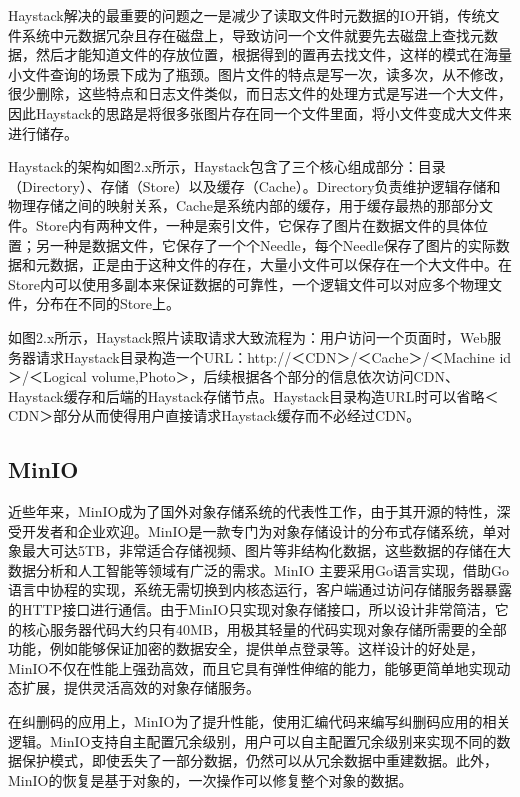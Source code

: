 Haystack解决的最重要的问题之一是减少了读取文件时元数据的IO开销，传统文件系统中元数据冗杂且存在磁盘上，导致访问一个文件就要先去磁盘上查找元数据，然后才能知道文件的存放位置，根据得到的置再去找文件，这样的模式在海量小文件查询的场景下成为了瓶颈。图片文件的特点是写一次，读多次，从不修改，很少删除，这些特点和日志文件类似，而日志文件的处理方式是写进一个大文件，因此Haystack的思路是将很多张图片存在同一个文件里面，将小文件变成大文件来进行储存。

Haystack的架构如图2.x所示，Haystack包含了三个核心组成部分：目录（Directory）、存储（Store）以及缓存（Cache）。Directory负责维护逻辑存储和物理存储之间的映射关系，Cache是系统内部的缓存，用于缓存最热的那部分文件。Store内有两种文件，一种是索引文件，它保存了图片在数据文件的具体位置；另一种是数据文件，它保存了一个个Needle，每个Needle保存了图片的实际数据和元数据，正是由于这种文件的存在，大量小文件可以保存在一个大文件中。在Store内可以使用多副本来保证数据的可靠性，一个逻辑文件可以对应多个物理文件，分布在不同的Store上。

如图2.x所示，Haystack照片读取请求大致流程为：用户访问一个页面时，Web服务器请求Haystack目录构造一个URL：http://＜CDN＞/＜Cache＞/＜Machine id＞/＜Logical volume,Photo＞，后续根据各个部分的信息依次访问CDN、Haystack缓存和后端的Haystack存储节点。Haystack目录构造URL时可以省略＜CDN＞部分从而使得用户直接请求Haystack缓存而不必经过CDN。

\subsection{MinIO}%
近些年来，MinIO成为了国外对象存储系统的代表性工作，由于其开源的特性，深受开发者和企业欢迎。MinIO是一款专门为对象存储设计的分布式存储系统，单对象最大可达5TB\cite{33}，非常适合存储视频、图片等非结构化数据，这些数据的存储在大数据分析和人工智能等领域有广泛的需求。MinIO 主要采用Go语言实现，借助Go语言中协程的实现，系统无需切换到内核态运行，客户端通过访问存储服务器暴露的HTTP接口进行通信。由于MinIO只实现对象存储接口，所以设计非常简洁，它的核心服务器代码大约只有40MB，用极其轻量的代码实现对象存储所需要的全部功能，例如能够保证加密的数据安全，提供单点登录等。这样设计的好处是，MinIO不仅在性能上强劲高效，而且它具有弹性伸缩的能力，能够更简单地实现动态扩展，提供灵活高效的对象存储服务。

在纠删码的应用上，MinIO为了提升性能，使用汇编代码来编写纠删码应用的相关逻辑。MinIO支持自主配置冗余级别，用户可以自主配置冗余级别来实现不同的数据保护模式，即使丢失了一部分数据，仍然可以从冗余数据中重建数据。此外，MinIO的恢复是基于对象的，一次操作可以修复整个对象的数据。

